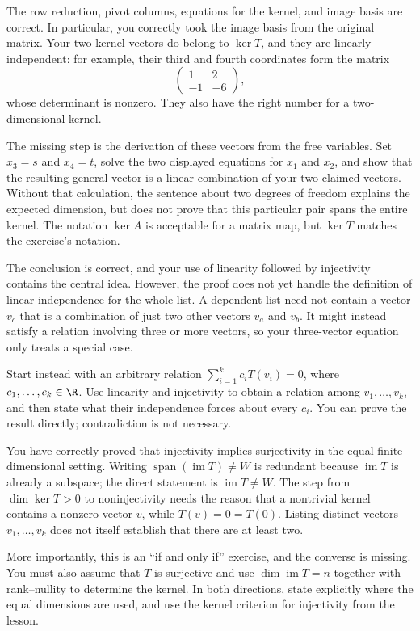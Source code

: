\begin{feedback}[\cref{ex:la-9}]
The row reduction, pivot columns, equations for the kernel, and image
basis are correct. In particular, you correctly took the image basis from
the original matrix. Your two kernel vectors do belong to $\ker T$, and
they are linearly independent: for example, their third and fourth
coordinates form the matrix
\[
  \begin{pmatrix}1&2\\-1&-6\end{pmatrix},
\]
whose determinant is nonzero. They also have the right number for a
two-dimensional kernel.

The missing step is the derivation of these vectors from the free
variables. Set $x_3=s$ and $x_4=t$, solve the two displayed equations for
$x_1$ and $x_2$, and show that the resulting general vector is a linear
combination of your two claimed vectors. Without that calculation, the
sentence about two degrees of freedom explains the expected dimension,
but does not prove that this particular pair spans the entire kernel.
The notation $\ker A$ is acceptable for a matrix map, but $\ker T$ matches
the exercise's notation.
\end{feedback}

\begin{feedback}[\cref{ex:la-10}]
The conclusion is correct, and your use of linearity followed by
injectivity contains the central idea. However, the proof does not yet
handle the definition of linear independence for the whole list. A
dependent list need not contain a vector $v_c$ that is a combination of
just two other vectors $v_a$ and $v_b$. It might instead satisfy a
relation involving three or more vectors, so your three-vector equation
only treats a special case.

Start instead with an arbitrary relation
$\sum_{i=1}^k c_iT(v_i)=0$, where $c_1,\ldots,c_k\in\R$. Use linearity
and injectivity to obtain a relation among $v_1,\ldots,v_k$, and then
state what their independence forces about every $c_i$. You can prove
the result directly; contradiction is not necessary.
\end{feedback}

\begin{feedback}[\cref{ex:la-11}]
You have correctly proved that injectivity implies surjectivity in the
equal finite-dimensional setting. Writing
$\operatorname{span}(\operatorname{im}T)\ne W$ is redundant because
$\operatorname{im}T$ is already a subspace; the direct statement is
$\operatorname{im}T\ne W$. The step from $\dim\ker T>0$ to
noninjectivity needs the reason that a nontrivial kernel contains a
nonzero vector $v$, while $T(v)=0=T(0)$. Listing distinct vectors
$v_1,\ldots,v_k$ does not itself establish that there are at least two.

More importantly, this is an ``if and only if'' exercise, and the
converse is missing. You must also assume that $T$ is surjective and use
$\dim\operatorname{im}T=n$ together with rank--nullity to determine the
kernel. In both directions, state explicitly where the equal dimensions
are used, and use the kernel criterion for injectivity from the lesson.
\end{feedback}

